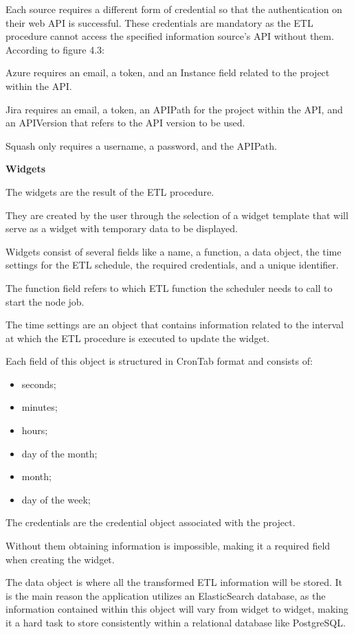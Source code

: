 \documentclass[a4paper,twoside,10pt]{report}
\begin{document}
Each source requires a different form of credential so that the authentication on their web API is successful. These credentials are mandatory as the ETL procedure cannot access the specified information source's API without them.
\newline
According to figure 4.3:
\newline

Azure requires an email, a token, and an Instance field related to the project within the API.

Jira requires an email, a token, an APIPath for the project within the API, and an APIVersion that refers to the API version to be used.

Squash only requires a username, a password, and the APIPath.

\newpage

\textbf{Widgets}

The widgets are the result of the ETL procedure.

They are created by the user through the selection of a widget template that will serve as a widget with temporary data to be displayed.

Widgets consist of several fields like a name, a function, a data object, the time settings for the ETL schedule, the required credentials, and a unique identifier.

The function field refers to which ETL function the scheduler needs to call to start the node job.

The time settings are an object that contains information related to the interval at which the ETL procedure is executed to update the widget. 

Each field of this object is structured in CronTab format and consists of:
\begin{itemize}
 \item seconds;
 \item minutes;
 \item hours;
 \item day of the month;
 \item month;
 \item day of the week;
\end{itemize}
The credentials are the credential object associated with the project.

Without them obtaining information is impossible, making it a required field when creating the widget.

The data object is where all the transformed ETL information will be stored. It is the main reason the application utilizes an ElasticSearch database, as the information contained within this object will vary from widget to widget, making it a hard task to store consistently within a relational database like PostgreSQL.
\end{document}
